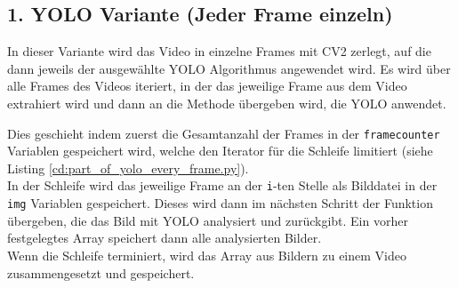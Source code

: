 \subsection{1. YOLO Variante (Jeder Frame einzeln)} {
	\label{py:YOLO_every_frame}
	In dieser Variante wird das Video in einzelne Frames mit CV2 zerlegt, auf die dann jeweils der ausgewählte YOLO Algorithmus angewendet wird. 
	Es wird über alle Frames des Videos iteriert, in der das jeweilige Frame aus dem Video extrahiert wird und dann an die Methode übergeben wird, die YOLO anwendet.
	
	Dies geschieht indem zuerst die Gesamtanzahl der Frames in der \lstinline|framecounter| Variablen gespeichert wird, welche den Iterator für die Schleife limitiert (siehe Listing \ref{cd:part_of_yolo_every_frame.py}). \\ 
	In der Schleife wird das jeweilige Frame an der \lstinline|i|-ten Stelle als Bilddatei in der \lstinline|img| Variablen gespeichert. Dieses wird dann im nächsten Schritt der Funktion übergeben, die das Bild mit YOLO analysiert und zurückgibt. Ein vorher festgelegtes Array speichert dann alle analysierten Bilder. \\ 
	Wenn die Schleife terminiert, wird das Array aus Bildern zu einem Video zusammengesetzt und gespeichert. \\

	
	
	
}
